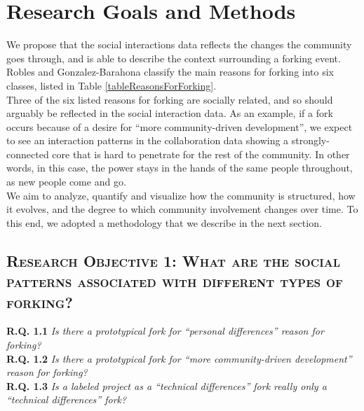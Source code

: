 \documentclass[conference]{IEEEtran}
\begin{document}
\section{Research Goals and Methods}
\label{RQs}
We propose that the social interactions data reflects the changes the community goes through, and is able to describe the context surrounding a forking event. Robles and Gonzalez-Barahona \cite{Robles} classify the main reasons for forking into six classes, listed in Table \ref{tableReasonsForForking}. \\

Three of the six listed reasons for forking are socially related, and so should arguably be reflected in the social interaction data. As an example, if a fork occurs because of a desire for ``more community-driven development'', we expect to see an interaction patterns in the collaboration data showing a strongly-connected core that is hard to penetrate for the rest of the community. In other words, in this case, the power stays in the hands of the same people throughout, as new people come and go.\\

We aim to analyze, quantify and visualize how the community is structured, how it evolves, and the degree to which community involvement changes over time. To this end, we adopted a methodology that we describe in the next section.\\


\subsection*{\textsc{\textbf{Research Objective 1}:  What are the social patterns associated with different types of forking?\\}}

\textbf{R.Q. 1.1 }  \textit{Is there a prototypical fork for “personal differences” reason for forking?}\\

\textbf{R.Q. 1.2}  \textit{Is there a prototypical fork for “more community-driven development” reason for forking?}\\

\textbf{R.Q. 1.3}  \textit{Is a labeled project as a “technical differences” fork really only a “technical differences” fork?}\\
\end{document}
